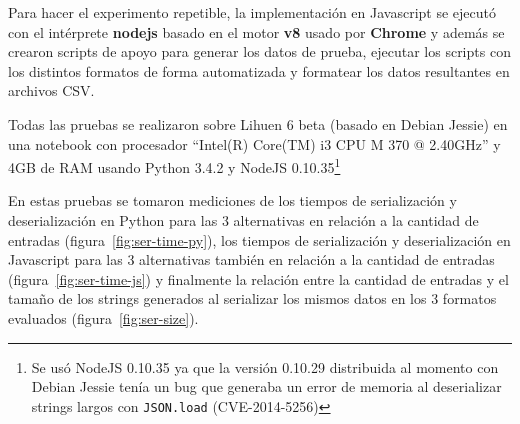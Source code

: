 Para hacer el experimento repetible, la implementación en
Javascript se ejecutó con el intérprete \textbf{nodejs} basado en
el motor \textbf{v8} usado por \textbf{Chrome} y además se crearon
scripts de apoyo para generar los datos de prueba, ejecutar los scripts
con los distintos formatos de forma automatizada y formatear los datos
resultantes en archivos CSV.

Todas las pruebas se realizaron sobre Lihuen 6 beta (basado en Debian Jessie)
en una notebook con procesador ``Intel(R) Core(TM) i3 CPU M 370 @ 2.40GHz''
y 4GB de RAM %
usando Python 3.4.2 y NodeJS 0.10.35\footnote{Se usó NodeJS 0.10.35 ya que
la versión 0.10.29 distribuida al momento con Debian Jessie tenía un bug que
generaba un error de memoria al
deserializar strings largos con \texttt{JSON.load} (CVE-2014-5256)}

En estas pruebas se tomaron mediciones de los tiempos de serialización y deserialización
en Python para las 3 alternativas en relación a la cantidad de entradas
(figura~\ref{fig:ser-time-py}), los tiempos de serialización y deserialización en
Javascript para las 3 alternativas también en relación a la cantidad de entradas
(figura~\ref{fig:ser-time-js}) y finalmente la relación entre la cantidad de
entradas y el tamaño de los strings generados al serializar los mismos datos en los 3 formatos
evaluados
(figura~\ref{fig:ser-size}).

